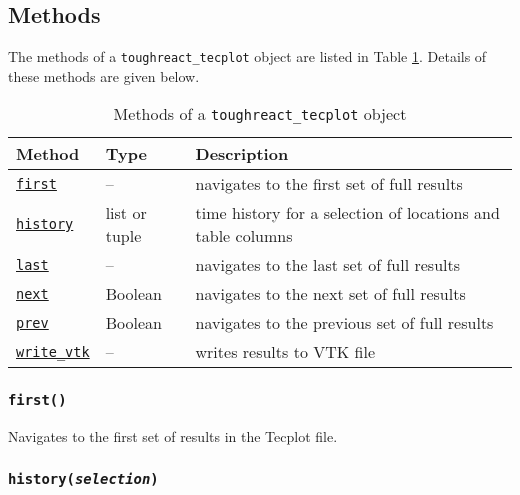 \subsection{Methods}

The methods of a \texttt{toughreact\_tecplot} object are listed in Table \ref{tb:toughreact_tecplot_methods}. Details of these methods are given below.

\begin{table}
  \begin{center}
    \begin{tabular}{|l|l|p{90mm}|}
      \hline
      \textbf{Method} & \textbf{Type} & \textbf{Description}\\
      \hline
      \hyperref[sec:toughreact_tecplot:first]{\texttt{first}} & -- & navigates to the first set of full results\\
      \hyperref[sec:toughreact_tecplot:history]{\texttt{history}} & list or tuple & time history for a selection of locations and table columns\\
      \hyperref[sec:toughreact_tecplot:last]{\texttt{last}} & -- & navigates to the last set of full results\\
      \hyperref[sec:toughreact_tecplot:next]{\texttt{next}} & Boolean & navigates to the next set of full results\\
      \hyperref[sec:toughreact_tecplot:prev]{\texttt{prev}} & Boolean & navigates to the previous set of full results\\
      \hyperref[sec:toughreact_tecplot:write_vtk]{\texttt{write\_vtk}} & -- & writes results to VTK file\\
      \hline
    \end{tabular}
    \caption{Methods of a \texttt{toughreact\_tecplot} object}
    \label{tb:toughreact_tecplot_methods}
  \end{center}
\end{table}

\begin{snugshade}
\subsubsection{\texttt{first()}}
\end{snugshade}
\label{sec:toughreact_tecplot:first}

Navigates to the first set of results in the Tecplot file.

\begin{snugshade}
\subsubsection{\texttt{history(\emph{selection})}}
\end{snugshade}
\label{sec:toughreact_tecplot:history}

